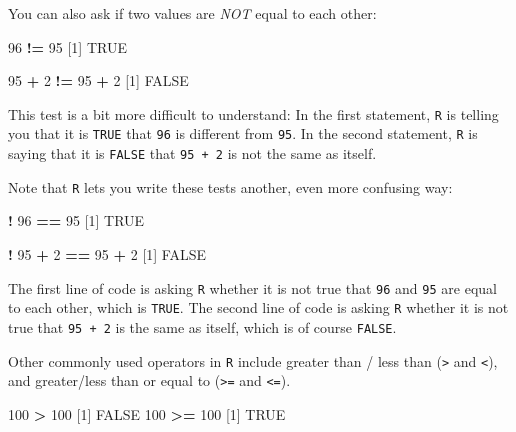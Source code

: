 \documentclass[
]{book}
\newenvironment{Shaded}{\begin{snugshade}}{\end{snugshade}}
\newcommand{\DecValTok}[1]{\textcolor[rgb]{0.00,0.00,0.81}{#1}}
\newcommand{\NormalTok}[1]{#1}
\newcommand{\OperatorTok}[1]{\textcolor[rgb]{0.81,0.36,0.00}{\textbf{#1}}}
\newcommand{\OtherTok}[1]{\textcolor[rgb]{0.56,0.35,0.01}{#1}}
\newcommand{\StringTok}[1]{\textcolor[rgb]{0.31,0.60,0.02}{#1}}
\begin{document}
You can also ask if two values are \emph{NOT} equal to each other:

\begin{Shaded}
\begin{Highlighting}[]
\DecValTok{96} \OperatorTok{!=}\StringTok{ }\DecValTok{95}
\NormalTok{[}\DecValTok{1}\NormalTok{] }\OtherTok{TRUE}

\DecValTok{95} \OperatorTok{+}\StringTok{ }\DecValTok{2} \OperatorTok{!=}\StringTok{ }\DecValTok{95} \OperatorTok{+}\StringTok{ }\DecValTok{2}
\NormalTok{[}\DecValTok{1}\NormalTok{] }\OtherTok{FALSE}
\end{Highlighting}
\end{Shaded}

This test is a bit more difficult to understand: In the first statement, \texttt{R} is telling you that it is \texttt{TRUE} that \texttt{96} is different from \texttt{95}. In the second statement, \texttt{R} is saying that it is \texttt{FALSE} that \texttt{95\ +\ 2} is not the same as itself.

Note that \texttt{R} lets you write these tests another, even more confusing way:

\begin{Shaded}
\begin{Highlighting}[]
\OperatorTok{!}\StringTok{ }\DecValTok{96} \OperatorTok{==}\StringTok{ }\DecValTok{95}
\NormalTok{[}\DecValTok{1}\NormalTok{] }\OtherTok{TRUE}

\OperatorTok{!}\StringTok{ }\DecValTok{95} \OperatorTok{+}\StringTok{ }\DecValTok{2} \OperatorTok{==}\StringTok{ }\DecValTok{95} \OperatorTok{+}\StringTok{ }\DecValTok{2}
\NormalTok{[}\DecValTok{1}\NormalTok{] }\OtherTok{FALSE}
\end{Highlighting}
\end{Shaded}

The first line of code is asking \texttt{R} whether it is not true that \texttt{96} and \texttt{95} are equal to each other, which is \texttt{TRUE}. The second line of code is asking \texttt{R} whether it is not true that \texttt{95\ +\ 2} is the same as itself, which is of course \texttt{FALSE}.

Other commonly used operators in \texttt{R} include greater than / less than (\texttt{\textgreater{}} and \texttt{\textless{}}), and greater/less than or equal to (\texttt{\textgreater{}=} and \texttt{\textless{}=}).

\begin{Shaded}
\begin{Highlighting}[]
\DecValTok{100} \OperatorTok{>}\StringTok{ }\DecValTok{100}
\NormalTok{[}\DecValTok{1}\NormalTok{] }\OtherTok{FALSE}
\DecValTok{100} \OperatorTok{>=}\StringTok{ }\DecValTok{100}
\NormalTok{[}\DecValTok{1}\NormalTok{] }\OtherTok{TRUE}
\end{Highlighting}
\end{Shaded}
\end{document}
